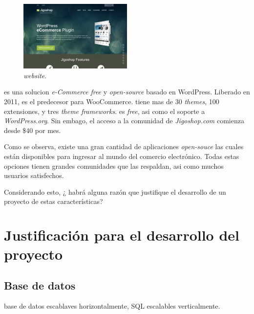 \subsection{\nameJigoshop}

\begin{figure}[h!]
	\centering
	\includegraphics[width=0.5\textwidth]{figuras/cap1/JigoshopWebsite.jpg}
	\caption{\nameJigoshop \textit{website}\cite{online_Jigoshop}.}
\end{figure}

\nameJigoshop es una solucion \textit{e-Commerce} \textit{free} y \textit{open-source} basado en WordPress. Liberado en 2011, \nameJigoshop es el predecesor para WooCommerce. \nameJigoshop tiene mas de 30   \textit{themes}, 100 extensiones, y tres \textit{theme frameworks}. \nameJigoshop es  \textit{free}, asi como el soporte a \textit{WordPress.org}. Sin embago, el acceso a la comunidad de \textit{Jigoshop.com} comienza desde \$40 por mes.



Como se observa, existe una gran cantidad de aplicaciones \textit{open-souce} las cuales están disponibles para ingresar al mundo del comercio electrónico. Todas estas opciones tienen grandes comunidades que las respaldan, asi como muchos usuarios satisfechos. 

Considerando esto, ¿ habrá alguna razón que justifique el desarrollo de un proyecto de estas características?

\section{Justificación para el desarrollo del proyecto}\label{cap:estadoArte:justificacion_proyecto}

\subsection{Base de datos}

base de datos escablaves horizontalmente, SQL escalables verticalmente.




